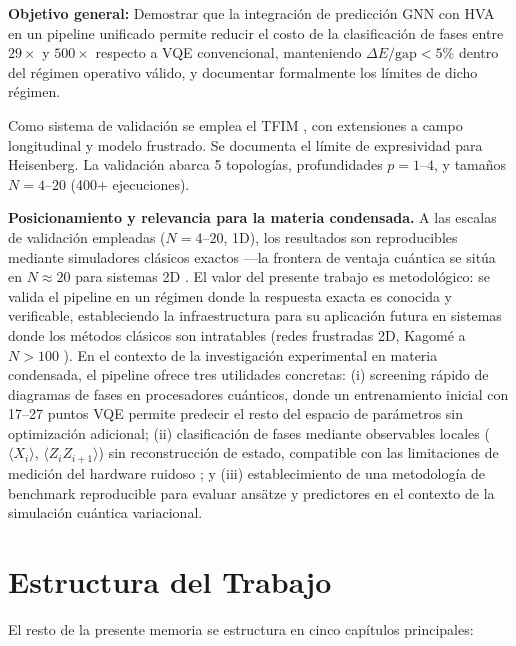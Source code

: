 \documentclass[11pt,a4paper,spanish]{book}
\begin{document}
\textbf{Objetivo general:} Demostrar que la integración de predicción GNN con HVA en un pipeline unificado permite reducir el costo de la clasificación de fases entre $29\times$ y $500\times$ respecto a VQE convencional, manteniendo $\Delta E/\text{gap} < 5\%$ dentro del régimen operativo válido, y documentar formalmente los límites de dicho régimen.

Como sistema de validación se emplea el TFIM \citep{dutta2015}, con extensiones a campo longitudinal y modelo frustrado. Se documenta el límite de expresividad para Heisenberg. La validación abarca 5 topologías, profundidades $p = 1$--$4$, y tamaños $N = 4$--$20$ (400+ ejecuciones).

\textbf{Posicionamiento y relevancia para la materia condensada.} A las escalas de validación empleadas ($N = 4$--$20$, 1D), los resultados son reproducibles mediante simuladores clásicos exactos ---la frontera de ventaja cuántica se sitúa en $N \approx 20$ para sistemas 2D \citep{martin2026}. El valor del presente trabajo es metodológico: se valida el pipeline en un régimen donde la respuesta exacta es conocida y verificable, estableciendo la infraestructura para su aplicación futura en sistemas donde los métodos clásicos son intratables (redes frustradas 2D, Kagomé a $N > 100$ \citep{ahsan2025}). En el contexto de la investigación experimental en materia condensada, el pipeline ofrece tres utilidades concretas: (i) screening rápido de diagramas de fases en procesadores cuánticos, donde un entrenamiento inicial con 17--27 puntos VQE permite predecir el resto del espacio de parámetros sin optimización adicional; (ii) clasificación de fases mediante observables locales ($\langle X_i \rangle$, $\langle Z_i Z_{i+1} \rangle$) sin reconstrucción de estado, compatible con las limitaciones de medición del hardware ruidoso \citep{sharma2026}; y (iii) establecimiento de una metodología de benchmark reproducible para evaluar ansätze y predictores en el contexto de la simulación cuántica variacional.

\section{Estructura del Trabajo}

El resto de la presente memoria se estructura en cinco capítulos principales:
\end{document}
